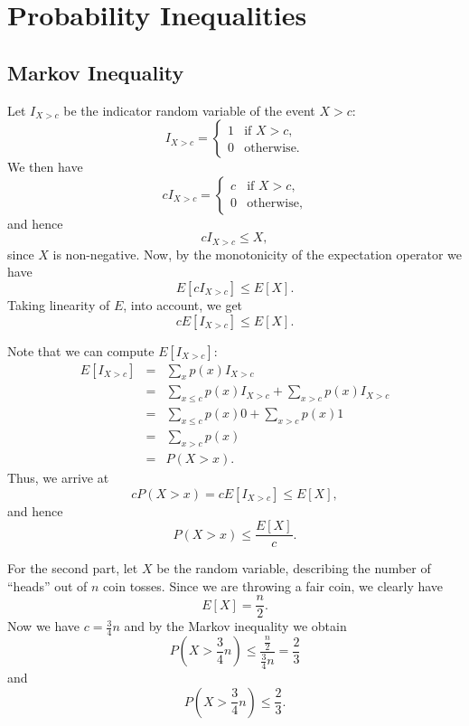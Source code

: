 \section{Probability Inequalities}
\subsection{Markov Inequality}

Let $I_{X > c}$ be the indicator random variable of the event $X > c$:
\[
    I_{X> c} = \begin{cases}
                  1 & \text{if $X > c$,} \\
                  0 & \text{otherwise.}
                  \end{cases}
\]
We then have
\[
    cI_{X> c} = \begin{cases}
                   c & \text{if $X > c$,} \\
                   0 & \text{otherwise,}
                   \end{cases}
\]
and hence $$cI_{X> c} \leq X,$$ since $X$ is non-negative. 
Now, by the monotonicity of the expectation operator we have 
$$E[cI_{X> c}] \leq E[X].$$ Taking linearity of $E$, into account,
we get $$cE[I_{X> c}] \leq E[X].$$

Note that we can compute $E[I_{X> c}]$:
\begin{eqnarray*}
    E[I_{X> c}] &=& \sum_{x}p(x)I_{X> c} \\
                   &=& \sum_{x \leq c}p(x)I_{X> c} + \sum_{x > c}p(x)I_{X> c} \\
                   &=& \sum_{x \leq c}p(x)0 + \sum_{x > c}p(x)1 \\
                   &=& \sum_{x > c}p(x) \\
                   &=& P(X> x).
\end{eqnarray*}
Thus, we arrive at $$ cP(X > x) = cE[I_{X > c}] \leq E[X], $$ and hence
$$ P(X > x) \leq \frac{E[X]}{c}.$$

For the second part, let $X$ be the random variable, describing the number
of ``heads'' out of $n$ coin tosses. Since we are throwing a fair coin, we
clearly have $$ E[X] = \frac{n}{2}.$$ Now we have $c=\frac{3}{4}n$ and by the
Markov inequality we obtain 
\[ 
  P\left(X> \frac{3}{4}n\right) \leq \frac{\frac{n}{2}}{\frac{3}{4}n} 
    = \frac{2}{3}
\]
and $$ P\left(X > \frac{3}{4}n\right)\leq \frac{2}{3}.$$



